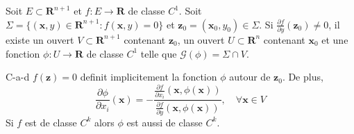 \begin{theorem}
Soit $E\subset \mathbf{R}^{n+1}$ et $f:E\to \mathbf{R}$ de classe $C^{1}$. Soit $\Sigma=\{ (\boldsymbol{x},y)\in \mathbf{R}^{n+1}:f(\boldsymbol{x},y)=0 \}$ et $\boldsymbol{z}_{0}=(\boldsymbol{x}_{0},y_{0})\in\Sigma$. Si $\frac{ \partial f }{ \partial y }(\boldsymbol{z}_{0})\neq 0$, il existe un ouvert $V\subset \mathbf{R}^{n+1}$ contenant $\boldsymbol{z}_{0}$, un ouvert $U\subset \mathbf{R}^{n}$ contenant $\boldsymbol{x}_{0}$ et une fonction $\phi:U\to \mathbf{R}$ de classe $C^{1}$ telle que $\mathcal{G}(\phi)=\Sigma \cap V$. 

C-a-d $f(\boldsymbol{z})=0$ definit implicitement la fonction $\phi$ autour de $\boldsymbol{z}_{0}$. De plus, 
$$
\frac{ \partial \phi }{ \partial x_{i} }(\boldsymbol{x})=-\frac{\frac{ \partial f }{ \partial x_{i} } (\boldsymbol{x},\phi(\boldsymbol{x}))}{\frac{ \partial f }{ \partial y } (\boldsymbol{x},\phi(\boldsymbol{x}))},\quad \forall \boldsymbol{x}\in V
$$
Si $f$ est de classe $C^{k}$ alors $\phi$ est aussi de classe $C^{k}$.

\end{theorem}
